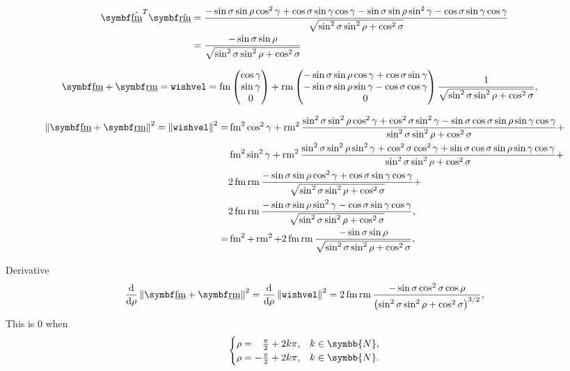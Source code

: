 \begin{align*}
\uvec{\flat{\fmove}}^T \uvec{\flat{\rmove}} &= \frac{-\sin\sigma\sin\rho\cos^2\gamma + \cos\sigma\sin\gamma\cos\gamma - \sin\sigma\sin\rho\sin^2\gamma - \cos\sigma\sin\gamma\cos\gamma}{\sqrt{\sin^2\sigma\sin^2\rho + \cos^2\sigma}}\\
&= \frac{-\sin\sigma\sin\rho}{\sqrt{\sin^2\sigma\sin^2\rho + \cos^2\sigma}}
\end{align*}

\begin{align*}
\vec{\flat{\fmove}} + \vec{\flat{\rmove}} = \texttt{wishvel} &= \fmove
\begin{pmatrix}
	\cos\gamma\\
	\sin\gamma\\
	0
\end{pmatrix} + \rmove
\begin{pmatrix}
	-\sin\sigma\sin\rho\cos\gamma + \cos\sigma\sin\gamma\\
	-\sin\sigma\sin\rho\sin\gamma - \cos\sigma\cos\gamma\\
	0
\end{pmatrix} \frac{1}{\sqrt{\sin^2\sigma\sin^2\rho + \cos^2\sigma}},
\end{align*}

\begin{align*}
\norm{\vec{\flat{\fmove}} + \vec{\flat{\rmove}}}^2 = \norm{\texttt{wishvel}}^2 = &\fmove^2 \cos^2\gamma + \rmove^2 \frac{\sin^2\sigma\sin^2\rho\cos^2\gamma + \cos^2\sigma\sin^2\gamma - \sin\sigma\cos\sigma\sin\rho\sin\gamma\cos\gamma}{\sin^2\sigma\sin^2\rho + \cos^2\sigma} +\\
&\fmove^2 \sin^2\gamma + \rmove^2 \frac{\sin^2\sigma\sin^2\rho\sin^2\gamma + \cos^2\sigma\cos^2\gamma + \sin\sigma\cos\sigma\sin\rho\sin\gamma\cos\gamma}{\sin^2\sigma\sin^2\rho + \cos^2\sigma} +\\
&2\fmove\rmove\frac{-\sin\sigma\sin\rho\cos^2\gamma + \cos\sigma\sin\gamma\cos\gamma}{\sqrt{\sin^2\sigma\sin^2\rho + \cos^2\sigma}} +\\
&2\fmove\rmove\frac{-\sin\sigma\sin\rho\sin^2\gamma - \cos\sigma\sin\gamma\cos\gamma}{\sqrt{\sin^2\sigma\sin^2\rho + \cos^2\sigma}},\\
%
= &\fmove^2 + \rmove^2 + 2\fmove\rmove\frac{-\sin\sigma\sin\rho}{\sqrt{\sin^2\sigma\sin^2\rho + \cos^2\sigma}},
\end{align*}

Derivative
\begin{align*}
\frac{\mathrm{d}}{\mathrm{d}\rho} \norm{\vec{\flat{\fmove}} + \vec{\flat{\rmove}}}^2 = \frac{\mathrm{d}}{\mathrm{d}\rho} \norm{\texttt{wishvel}}^2 = 2\fmove\rmove\frac{-\sin\sigma\cos^2\sigma\cos\rho}{\left( \sin^2\sigma\sin^2\rho + \cos^2\sigma \right)^{3/2}},
\end{align*}
This is $0$ when
\[
\begin{cases}
	\rho = \hphantom{-}\frac{\pi}{2} + 2k\pi, &k \in \symbb{N},\\
	\rho = -\frac{\pi}{2} + 2k\pi, &k \in \symbb{N}.
\end{cases}
\]

